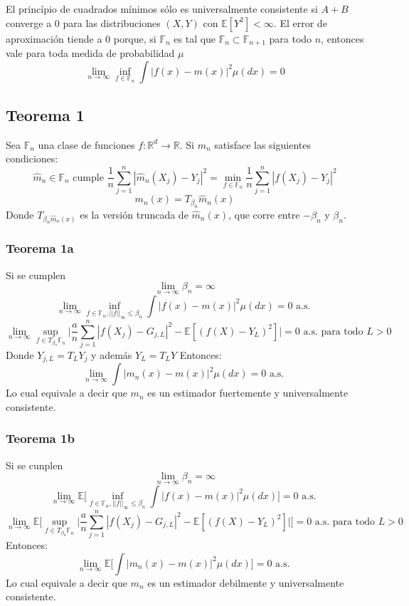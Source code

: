 \documentclass[12pt, a4paper]{article}
\begin{document}
El princípio de cuadrados mínimos sólo es universalmente consistente si $A+B$ converge a 0 para las distribuciones $(X,Y)$ con $\mathds{E}[Y^2]<\infty$.
El error de aproximación tiende a 0 porque, si $\mathds{F}_n$ es tal que $\mathds{F}_n \subset \mathds{F}_{n+1}$ para todo $n$, entonces vale para toda medida de probabilidad $\mu$
$$
\mathop{lim}_{n\rightarrow\infty}
\mathop{inf}_{f\in\mathds{F}_n}
\int|f(x)-m(x)|^2 \mu(dx)=0
$$
\subsection{Teorema 1}
Sea $\mathds{F}_n$ una clase de funciones $f:\mathds{R}^d\rightarrow\mathds{R}$. Si $m_n$ satisface las siguientes condiciones:
$$
\hat{m}_n \in \mathds{F}_n 
\text{ cumple }
\frac{1}{n} \sum_{j=1}^n | \hat{m}_n(X_j) -Y_j |^2 
= 
\mathop{min}_{f\in\mathds{F}_n}
\frac{1}{n} \sum_{j=1}^n | f(X_j) -Y_j |^2
$$
$$
m_n(x)=T_{\beta_n} \hat{m}_n(x)
$$
Donde $T_{\beta_n \hat{m}_n(x)}$ es la versión truncada de $\hat{m}_n(x)$, que corre entre $-\beta_n$ y $\beta_n$.
\subsubsection{Teorema 1a}
Si se cumplen
$$
\mathop{lim}_{n\rightarrow\infty} \beta_n = \infty
$$
$$
\mathop{lim}_{n\rightarrow\infty} 
\mathop{inf}_{f\in\mathds{F}_n, ||f||_{\infty}  \leq \beta_n} 
\int
|f(x)-m(x)|^2 \mu(dx)=0
\text{ a.s. }
$$
$$
\mathop{lim}_{n\rightarrow\infty} 
\mathop{sup}_{f\in T_{\beta_n}\mathds{F}_n} 
\Bigg|
\frac{a}{n} \sum_{j=1}^n |f(X_j)-G_{j,L}|^2
-
\mathds{E}[(f(X)-Y_L)^2]
\Bigg| = 0
\text{ a.s. para todo $L>0$}
$$
Donde $Y_{j,L}=T_L{Y_j}$ y además $Y_L=T_L{Y}$
Entonces:
$$
\mathop{lim}_{n\rightarrow\infty} 
\int |m_n(x)-m(x)|^2 \mu(dx)
= 0
\text{ a.s. }$$
Lo cual equivale a decir que $m_n$ es un estimador fuertemente y universalmente consistente.
\subsubsection{Teorema 1b}
Si se cunplen
$$
\mathop{lim}_{n\rightarrow\infty} \beta_n = \infty
$$
$$
\mathop{lim}_{n\rightarrow\infty} 
\mathds{E} \Bigg[
\mathop{inf}_{f\in\mathds{F}_n, ||f||_{\infty}  \leq \beta_n} 
\int
|f(x)-m(x)|^2 \mu(dx)
\Bigg]
=0
\text{ a.s. }
$$
$$
\mathop{lim}_{n\rightarrow\infty} 
\mathds{E} \Bigg[
\mathop{sup}_{f\in T_{\beta_n}\mathds{F}_n} 
\Bigg|
\frac{a}{n} \sum_{j=1}^n |f(X_j)-G_{j,L}|^2
-
\mathds{E}[(f(X)-Y_L)^2]
\Bigg| 
\Bigg]
= 0
\text{ a.s. para todo $L>0$}
$$
Entonces:
$$
\mathop{lim}_{n\rightarrow\infty} \mathds{E}
\Bigg[
\int |m_n(x)-m(x)|^2 \mu(dx)
\Bigg] = 0
\text{ a.s. }$$
Lo cual equivale a decir que $m_n$ es un estimador debilmente y universalmente consistente.
\end{document}
